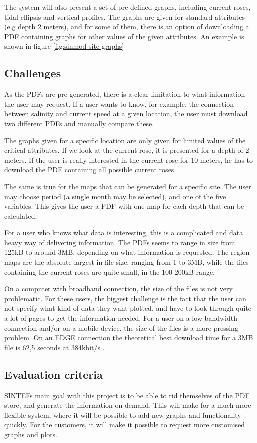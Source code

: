 \documentclass[11pt,a4paper,titlepage,oneside]{report}
\begin{document}
The system will also present a set of pre defined graphs, including current roses, tidal ellipsis and vertical profiles. The graphs are given for standard attributes (e.g depth 2 meters), and for some of them, there is an option of downloading a PDF containing graphs for other values of the given attributes. An example is shown in figure \ref{fig:sinmod-site-graphs}


\subsection{Challenges}
As the PDFs are pre generated, there is a clear limitation to what information the user may request. If a user wants to know, for example, the connection between salinity and current speed at a given location, the user must download two different PDFs and manually compare these. 

The graphs given for a specific location are only given for limited values of the critical attributes. If we look at the current rose, it is presented for a depth of 2 meters. If the user is really interested in the current rose for 10 meters, he has to download the PDF containing all possible current roses. 

The same is true for the maps that can be generated for a specific site. The user may choose period (a single month may be selected), and one of the five variables. This gives the user a PDF with one map for each depth that can be calculated. 

For a user who knows what data is interesting, this is a complicated and data heavy way of delivering information. The PDFs seems to range in size from 125kB to around 3MB, depending on what information is requested. The region maps are the absolute largest in file size, ranging from 1 to 3MB, while the files containing the current roses are quite small, in the 100-200kB range. 

On a computer with broadband connection, the size of the files is not very problematic. For these users, the biggest challenge is the fact that the user can not specify what kind of data they want plotted, and have to look through quite a lot of pages to get the information needed. For a user on a low bandwidth connection and/or on a mobile device, the size of the files is a more pressing problem. On an EDGE connection the theoretical best download time for a 3MB file is 62,5 seconds at 384kbit/s \cite{3gpp.com}.

\subsection{Evaluation criteria}
SINTEFs main goal with this project is to be able to rid themselves of the PDF store, and generate the information on demand. This will make for a much more flexible system, where it will be possible to add new graphs and functionality quickly. For the customers, it will make it possible to request more customised graphs and plots.
\end{document}
